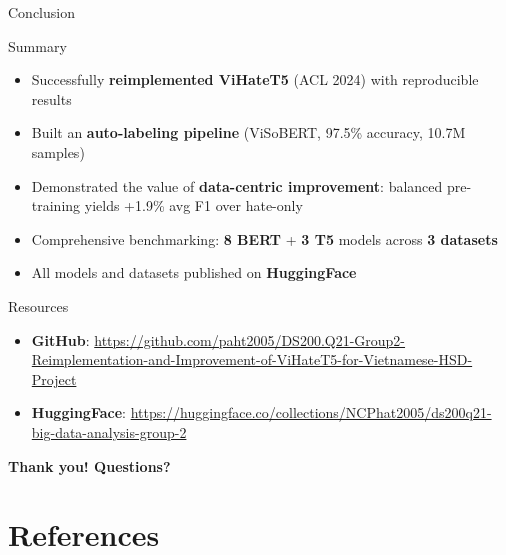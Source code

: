 \documentclass[10pt, aspectratio=169]{beamer}
\begin{document}
\begin{frame}[shrink=8]{Conclusion}
  \begin{block}{Summary}
    \begin{itemize}
      \item Successfully \textbf{reimplemented ViHateT5} (ACL 2024) with reproducible results
      \item Built an \textbf{auto-labeling pipeline} (ViSoBERT, 97.5\% accuracy, 10.7M samples)
      \item Demonstrated the value of \textbf{data-centric improvement}: balanced pre-training yields +1.9\% avg F1 over hate-only
      \item Comprehensive benchmarking: \textbf{8 BERT} + \textbf{3 T5} models across \textbf{3 datasets}
      \item All models and datasets published on \textbf{HuggingFace}
    \end{itemize}
  \end{block}
  \vspace{0.3cm}

  \begin{exampleblock}{Resources}
    \begin{itemize}
      \item \textbf{GitHub}: \url{https://github.com/paht2005/DS200.Q21-Group2-Reimplementation-and-Improvement-of-ViHateT5-for-Vietnamese-HSD-Project}
      \item \textbf{HuggingFace}: \url{https://huggingface.co/collections/NCPhat2005/ds200q21-big-data-analysis-group-2}
    \end{itemize}
  \end{exampleblock}

  \vspace{0.3cm}
  \begin{center}
    {\Large\bfseries\color{uitblue} Thank you! Questions?}
  \end{center}
\end{frame}

\section{References}
\end{document}
